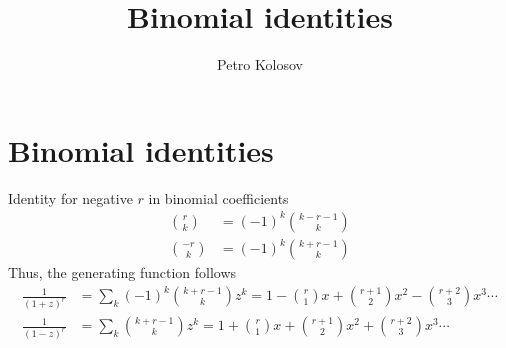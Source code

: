 ﻿\documentclass[12pt,letterpaper,oneside,reqno]{amsart}
\title[Binomial identities]
{Binomial identities}
\author[Petro Kolosov]{Petro Kolosov}
\numberwithin{equation}{section}
\begin{document}
    \maketitle

    \section{Binomial identities}\label{sec:binomial-identities}
    Identity for negative $r$ in binomial coefficients
    \begin{align*}
        \binom{r}{k}  &= (-1)^k \binom{k-r-1}{k} \\
        \binom{-r}{k} &= (-1)^k \binom{k+r-1}{k}
    \end{align*}
    Thus, the generating function follows
    \begin{align*}
        \frac{1}{(1+z)^r} &= \sum_{k} (-1)^k \binom{k+r-1}{k} z^k = 1 - \binom{r}{1}x + \binom{r+1}{2} x^2 - \binom{r+2}{3} x^3 \cdots \\
        \frac{1}{(1-z)^r} &= \sum_{k} \binom{k+r-1}{k} z^k = 1 + \binom{r}{1}x + \binom{r+1}{2} x^2 + \binom{r+2}{3} x^3 \cdots
    \end{align*}
\end{document}
